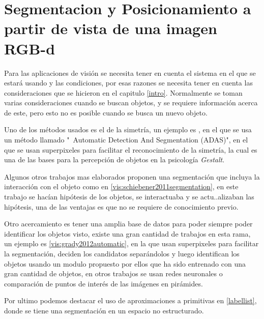     \chapter{Segmentacion y Posicionamiento a partir de vista de una imagen RGB-d}
    
    Para las aplicaciones de visión se necesita tener en cuenta el sistema en el que se estará usando y las condiciones, por esas razones se necesita tener en cuenta las consideraciones que se hicieron en el capitulo \ref{intro}. Normalmente se toman varias consideraciones cuando se buscan objetos, y se requiere información acerca de este, pero esto no es posible cuando se busca un nuevo objeto.
    
    Uno de los métodos usados es el de la simetría, un ejemplo es \cite{vis:kootstra2010fast}, en el que se usa un método llamado "\ Automatic Detection And Segmentation (ADAS)", en el que se usan superpixeles para facilitar el reconocimiento de la simetría, la cual es una de las bases para la percepción de objetos en la psicología \textit{Gestalt}.
    
    Algunos otros trabajos mas elaborados proponen una segmentación que incluya la interacción con el objeto como en \cref{vis:schiebener2011segmentation}, en este trabajo se hacían hipótesis de los objetos, se interactuaba y se actu..alizaban las hipótesis, una de las ventajas es que no se requiere de conocimiento previo.
    
    Otro acercamiento es tener una amplia base de datos para poder siempre poder identificar los objetos visto, existe una gran cantidad de trabajos en esta rama, un ejemplo es \cref{vis:grady2012automatic}, en la que usan superpixeles para facilitar la segmentación, deciden los candidatos separándolos y luego identifican los objetos usando un modulo propuesto por ellos que ha sido entrenado con una gran cantidad de objetos, en otros trabajos se usan redes neuronales o comparación de puntos de interés de las imágenes en pirámides.
    
    Por ultimo podemos destacar el uso de aproximaciones a primitivas en \ref{labellist}, donde se tiene una segmentación en un espacio no estructurado.
    
    
